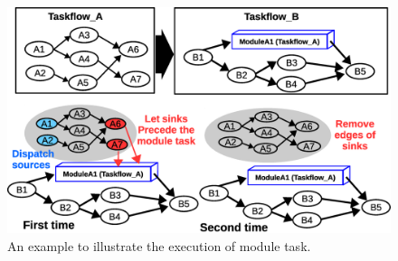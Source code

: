 \documentclass[conference]{IEEEtran}
\begin{document}
% 
% 
% 
% 
% 
% 




\begin{figure}[!h]
  \centering
  \includegraphics[width=.95\columnwidth]{Fig/scheduling.eps}
  \caption{
    An example to illustrate the execution of module task.
   }
  \label{fig::scheduling}
\end{figure}
\end{document}
